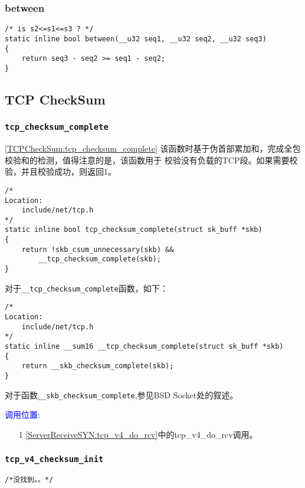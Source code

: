        \subsubsection{between}

\begin{verbatim}
/* is s2<=s1<=s3 ? */
static inline bool between(__u32 seq1, __u32 seq2, __u32 seq3)
{
    return seq3 - seq2 >= seq1 - seq2;
}
\end{verbatim}

    \subsection{TCP CheckSum}
        \subsubsection{\texttt{tcp_checksum_complete}}
            \ref{TCPCheckSum:tcp_checksum_complete}
            该函数时基于伪首部累加和，完成全包校验和的检测，值得注意的是，该函数用于
            校验没有负载的TCP段。如果需要校验，并且校验成功，则返回1。
\begin{verbatim}
/*
Location:
    include/net/tcp.h
*/
static inline bool tcp_checksum_complete(struct sk_buff *skb)
{
    return !skb_csum_unnecessary(skb) &&
        __tcp_checksum_complete(skb);
}
\end{verbatim}
            对于\texttt{__tcp_checksum_complete}函数，如下：
\begin{verbatim}
/*
Location:
    include/net/tcp.h
*/
static inline __sum16 __tcp_checksum_complete(struct sk_buff *skb)
{
    return __skb_checksum_complete(skb);
}
\end{verbatim}
            对于函数\texttt{__skb_checksum_complete},参见BSD Socket处的叙述。

            \textcolor{blue}{调用位置}:

                \begin{enumerate}
                    \item[1]        \ref{ServerReceiveSYN:tcp_v4_do_rcv}中的tcp\_v4\_do\_rcv调用。
                \end{enumerate}
            
        \subsubsection{\texttt{tcp_v4_checksum_init}}
\begin{verbatim}
/*没找到。。*/
\end{verbatim}
